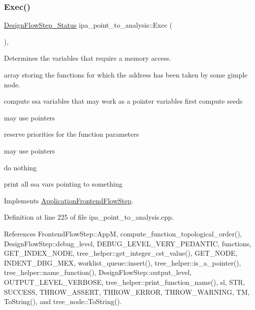 \mbox{\label{classipa__point__to__analysis_a9ef230477061e15dd1550e1ca226aa79}} 
\subsubsection{\texorpdfstring{Exec()}{Exec()}}
{\footnotesize\ttfamily \hyperlink{design__flow__step_8hpp_afb1f0d73069c26076b8d31dbc8ebecdf}{Design\+Flow\+Step\+\_\+\+Status} ipa\+\_\+point\+\_\+to\+\_\+analysis\+::\+Exec (\begin{DoxyParamCaption}{ }\end{DoxyParamCaption})\hspace{0.3cm}{\ttfamily [override]}, {\ttfamily [virtual]}}



Determines the variables that require a memory access. 

array storing the functions for which the address has been taken by some gimple node.

compute ssa variables that may work as a pointer variables first compute seeds

may use pointers

reserve priorities for the function parameters

may use pointers

do nothing

print all ssa vars pointing to something 

Implements \hyperlink{classApplicationFrontendFlowStep_a2bf060a5ebc1735635dc5c7773387a25}{Application\+Frontend\+Flow\+Step}.



Definition at line 225 of file ipa\+\_\+point\+\_\+to\+\_\+analysis.\+cpp.



References Frontend\+Flow\+Step\+::\+AppM, compute\+\_\+function\+\_\+topological\+\_\+order(), Design\+Flow\+Step\+::debug\+\_\+level, D\+E\+B\+U\+G\+\_\+\+L\+E\+V\+E\+L\+\_\+\+V\+E\+R\+Y\+\_\+\+P\+E\+D\+A\+N\+T\+IC, functions, G\+E\+T\+\_\+\+I\+N\+D\+E\+X\+\_\+\+N\+O\+DE, tree\+\_\+helper\+::get\+\_\+integer\+\_\+cst\+\_\+value(), G\+E\+T\+\_\+\+N\+O\+DE, I\+N\+D\+E\+N\+T\+\_\+\+D\+B\+G\+\_\+\+M\+EX, worklist\+\_\+queue\+::insert(), tree\+\_\+helper\+::is\+\_\+a\+\_\+pointer(), tree\+\_\+helper\+::name\+\_\+function(), Design\+Flow\+Step\+::output\+\_\+level, O\+U\+T\+P\+U\+T\+\_\+\+L\+E\+V\+E\+L\+\_\+\+V\+E\+R\+B\+O\+SE, tree\+\_\+helper\+::print\+\_\+function\+\_\+name(), sl, S\+TR, S\+U\+C\+C\+E\+SS, T\+H\+R\+O\+W\+\_\+\+A\+S\+S\+E\+RT, T\+H\+R\+O\+W\+\_\+\+E\+R\+R\+OR, T\+H\+R\+O\+W\+\_\+\+W\+A\+R\+N\+I\+NG, TM, To\+String(), and tree\+\_\+node\+::\+To\+String().

